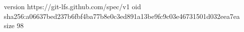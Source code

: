 version https://git-lfs.github.com/spec/v1
oid sha256:a06637bed237b6fbf4ba77b8e0c3ed891a13be9fc9c03e46731501d032eea7ea
size 98
